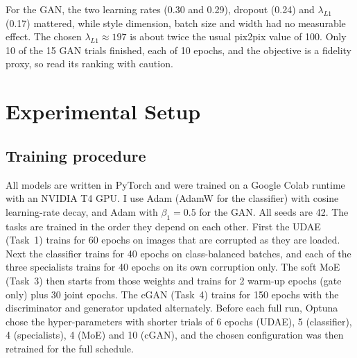 \documentclass[journal,onecolumn,12pt,a4paper]{IEEEtran}
\let\oldsection\section
\renewcommand{\section}[1]{\oldsection{\textbf{#1}}}
\let\oldsubsection\subsection
\renewcommand{\subsection}[1]{\oldsubsection{\textbf{#1}}}
\begin{document}
For the GAN, the two learning rates (0.30 and 0.29), dropout (0.24) and $\lambda_{L1}$ (0.17) mattered, while style dimension, batch size and width had no measurable effect. The chosen $\lambda_{L1}\approx197$ is about twice the usual pix2pix value of 100. Only 10 of the 15 GAN trials finished, each of 10 epochs, and the objective is a fidelity proxy, so read its ranking with caution.

\section{Experimental Setup}
\subsection{Training procedure}
All models are written in PyTorch and were trained on a Google Colab runtime with an NVIDIA T4 GPU. I use Adam (AdamW for the classifier) with cosine learning-rate decay, and Adam with $\beta_1=0.5$ for the GAN. All seeds are 42. The tasks are trained in the order they depend on each other. First the UDAE (Task~1) trains for 60 epochs on images that are corrupted as they are loaded. Next the classifier trains for 40 epochs on class-balanced batches, and each of the three specialists trains for 40 epochs on its own corruption only. The soft MoE (Task~3) then starts from those weights and trains for 2 warm-up epochs (gate only) plus 30 joint epochs. The cGAN (Task~4) trains for 150 epochs with the discriminator and generator updated alternately. Before each full run, Optuna chose the hyper-parameters with shorter trials of 6 epochs (UDAE), 5 (classifier), 4 (specialists), 4 (MoE) and 10 (cGAN), and the chosen configuration was then retrained for the full schedule.
\end{document}

